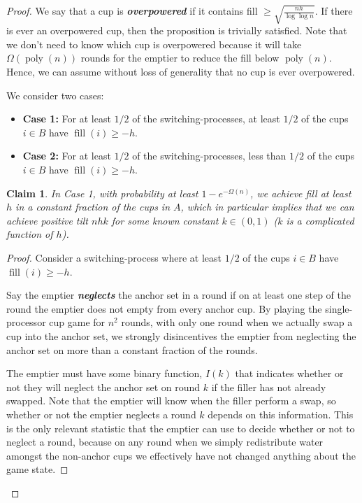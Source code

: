 \documentclass[twocolumn]{article}[11pt]
\newcommand{\defn}[1]{{\textit{\textbf{\boldmath #1}}}}
\DeclareMathOperator{\poly}{\text{poly}}
\DeclareMathOperator{\fil}{\text{fill}}
\newtheorem{clm}{Claim}
\begin{document}
\begin{proof}
We say that a cup is \defn{overpowered} if it contains fill $\ge
\sqrt{\frac{nh}{\log\log n}}$. If there is ever an overpowered cup, then the
proposition is trivially satisfied. Note that we don't need to know which cup
is overpowered because it will take $\Omega(\poly(n))$ rounds for the emptier
to reduce the fill below $\poly(n)$. Hence, we can assume without loss
of generality that no cup is ever overpowered.

We consider two cases:
\begin{itemize}
  \item \textbf{Case 1:} For at least $1/2$ of the switching-processes, at
    least $1/2$ of the cups $i \in B$ have $\fil(i) \ge -h$.
  \item \textbf{Case 2:} For at least $1/2$ of the switching-processes, less
    than $1/2$ of the cups $i \in B$ have $\fil(i) \ge -h$.
\end{itemize}

\begin{clm}
  \label{clm:reg} In Case 1, with probability at least $1-e^{-\Omega(n)}$, we
  achieve fill at least $h$ in a constant fraction of the cups in $A$, which in
  particular implies that we can achieve positive tilt $nhk$ for some known
  constant $k \in (0,1)$ ($k$ is a complicated function of $h$).
\end{clm}
\begin{proof}
  Consider a switching-process where at least $1/2$ of the cups $i \in B$
  have $\fil(i) \ge -h$.

  Say the emptier \defn{neglects} the anchor set in a round if on at least one
  step of the round the emptier does not empty from every anchor cup. By
  playing the single-processor cup game for $n^2$ rounds, with only one round
  when we actually swap a cup into the anchor set, we strongly disincentives
  the emptier from neglecting the anchor set on more than a constant fraction
  of the rounds. 

  The emptier must have some binary function, $I(k)$ that indicates whether or
  not they will neglect the anchor set on round $k$ if the filler has not already
  swapped. Note that the emptier will know when the filler perform a swap, so
  whether or not the emptier neglects a round $k$ depends on this information.
  This is the only relevant statistic that the emptier can use to decide
  whether or not to neglect a round, because on any round when we simply
  redistribute water amongst the non-anchor cups we effectively have not
  changed anything about the game state. 


\end{proof}
\end{proof}
\end{document}

